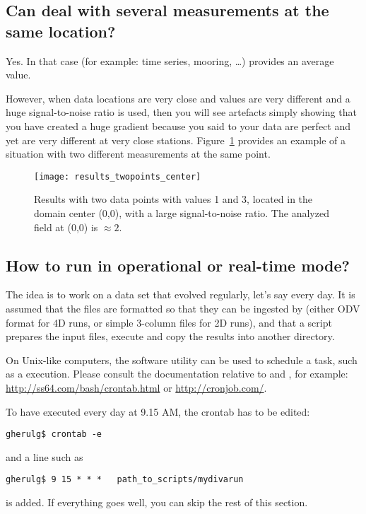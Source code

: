 \subsection{Can \diva deal with several measurements at the same location?}

Yes. In that case (for example: time series, mooring, \ldots) \diva provides an average value. 

However, when data locations are very close and values are very different and a huge signal-to-noise ratio is used, then you will see artefacts simply showing that you have created a huge gradient because you said to \diva your data are perfect and yet are very different at very close stations. Figure~\ref{fig:results_twopoints_center} provides an example of a situation with two different measurements at the same point.

\begin{figure}[H]
\centering 
\texttt{[image: results\_twopoints\_center]}
\caption[Results with two data points with values 1 and 3, located in the domain center (0,0), with a large signal-to-noise ratio.]{Results with two data points with values 1 and 3, located in the domain center (0,0), with a large signal-to-noise ratio. The analyzed field at (0,0) is $\approx 2$.\label{fig:results_twopoints_center}}
\end{figure}


\subsection{How to run \diva in operational or real-time mode?}

The idea is to work on a data set that evolved regularly, let's say every day. It is assumed that the files are formatted so that they can be ingested by \diva (either ODV format for 4D runs, or simple 3-column files for 2D runs), and that a script  prepares the input files, execute \diva and copy the results into another directory.

On Unix-like computers, the software utility  can be used to schedule a task, such as a \diva execution. Please consult the documentation relative to  and , for example: 
\url{http://ss64.com/bash/crontab.html} or \url{http://cronjob.com/}.

To have  executed every day at 9.15 AM, the crontab has to be edited:
\begin{lstlisting}[style=Bash]
gherulg$ crontab -e
\end{lstlisting}
and a line such as 
\begin{lstlisting}[style=Bash]
gherulg$ 9 15 * * *   path_to_scripts/mydivarun
\end{lstlisting}
is added. If everything goes well, you can skip the rest of this section.

